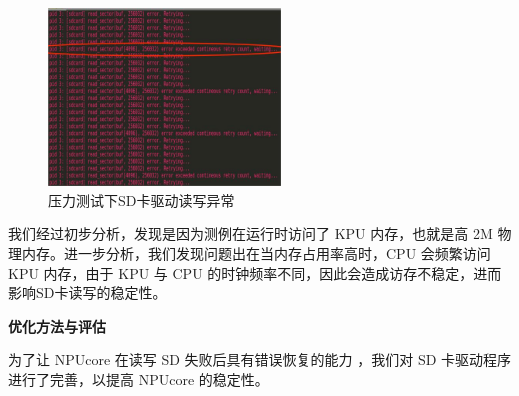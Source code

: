 \begin{figure}[h]
	\centering
	\includegraphics[width=0.55\textwidth]{figures/10-04-SD卡驱动异常.jpg}
	\caption{压力测试下SD卡驱动读写异常}
	\label{fig:SD error}
\end{figure}

我们经过初步分析，发现是因为测例在运行时访问了 KPU 内存，也就是高 2M 物理内存。进一步分析，我们发现问题出在当内存占用率高时，CPU 会频繁访问 KPU 内存，由于 KPU 与 CPU 的时钟频率不同，因此会造成访存不稳定，进而影响SD卡读写的稳定性。

\textbf{优化方法与评估}

为了让 NPUcore 在读写 SD 失败后具有错误恢复的能力 ，我们对 SD 卡驱动程序进行了完善，以提高 NPUcore 的稳定性。


